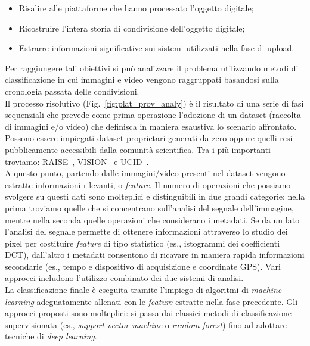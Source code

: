 \begin{itemize}
    \item Risalire alle piattaforme che hanno processato l'oggetto digitale;
    \item Ricostruire l'intera storia di condivisione dell'oggetto digitale;
    \item Estrarre informazioni significative sui sistemi utilizzati nella fase di upload.
\end{itemize}
Per raggiungere tali obiettivi si può analizzare il problema utilizzando metodi di classificazione in cui immagini e video vengono raggruppati basandosi sulla cronologia passata delle condivisioni.\\
Il processo risolutivo (Fig.~\ref{fig:plat_prov_analy}) è il risultato di una serie di fasi sequenziali che prevede come prima operazione l'adozione di un dataset (raccolta di immagini e/o video) che definisca in maniera esaustiva lo scenario affrontato. Possono essere impiegati dataset proprietari generati da zero oppure quelli resi pubblicamente accessibili dalla comunità scientifica. Tra i più importanti troviamo: RAISE~\cite{dang2015raise}, VISION~\cite{shullani2017vision} e UCID~\cite{schaefer2003ucid}.\\
A questo punto, partendo dalle immagini/video presenti nel dataset vengono estratte informazioni rilevanti, o \textit{feature}. Il numero di operazioni che possiamo svolgere su questi dati sono molteplici e distinguibili in due grandi categorie: nella prima troviamo quelle che si concentrano sull'analisi del segnale dell'immagine, mentre nella seconda quelle operazioni che considerano i metadati. Se da un lato l'analisi del segnale permette di ottenere informazioni attraverso lo studio dei pixel per costituire \textit{feature} di tipo statistico (es., istogrammi dei coefficienti DCT), dall'altro i metadati consentono di ricavare in maniera rapida informazioni secondarie (es., tempo e dispositivo di acquisizione e coordinate GPS). Vari approcci includono l'utilizzo combinato dei due sistemi di analisi.\\
La classificazione finale è eseguita tramite l'impiego di algoritmi di \textit{machine learning} adeguatamente allenati con le \textit{feature} estratte nella fase precedente. Gli approcci proposti sono molteplici: si passa dai classici metodi di classificazione supervisionata (es., \textit{support vector machine} o \textit{random forest}) fino ad adottare tecniche di \textit{deep learning}.

